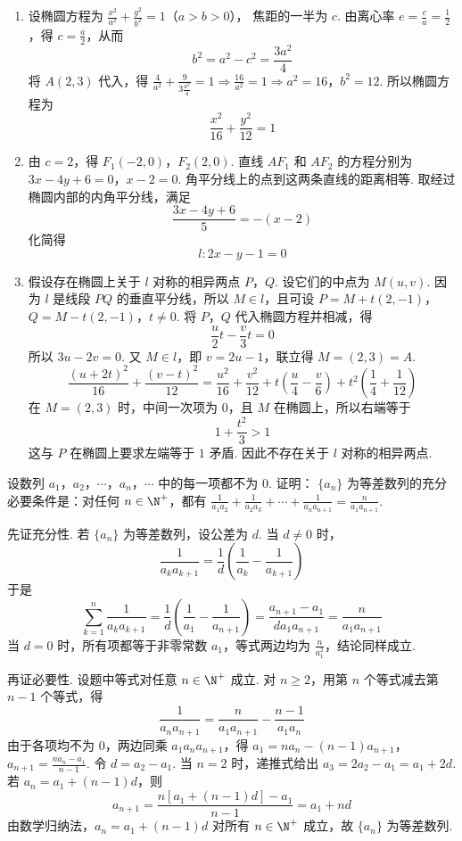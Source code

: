 \begin{solution}
\begin{enumerate}
\item 设椭圆方程为
\(\frac{x^2}{a^2}+\frac{y^2}{b^2}=1\)（\(a>b>0\)），
焦距的一半为 \(c\). 由离心率 \(e=\frac{c}{a}=\frac{1}{2}\)，得 \(c=\frac{a}{2}\)，从而
\[
b^2=a^2-c^2=\frac{3a^2}{4}
\]
将 \(A(2,3)\) 代入，得
\(\frac{4}{a^2}+\frac{9}{3\frac{a^2}{4}}=1 \Longrightarrow \frac{16}{a^2}=1 \Longrightarrow a^2=16\)，\(b^2=12\).
所以椭圆方程为
\[
\frac{x^2}{16}+\frac{y^2}{12}=1
\]
\item 由 \(c=2\)，得 \(F_1(-2,0)\)，\(F_2(2,0)\). 直线 \(AF_1\) 和 \(AF_2\) 的方程分别为
\(3x-4y+6=0\)，\(x-2=0\).
角平分线上的点到这两条直线的距离相等. 取经过椭圆内部的内角平分线，满足
\[
\frac{3x-4y+6}{5}=-(x-2)
\]
化简得
\[
l\colon 2x-y-1=0
\]
\item 假设存在椭圆上关于 \(l\) 对称的相异两点 \(P\)，\(Q\). 设它们的中点为 \(M(u,v)\). 因为 \(l\) 是线段 \(PQ\) 的垂直平分线，所以 \(M\in l\)，且可设
\(P=M+t(2,-1)\)，\(Q=M-t(2,-1)\)，\(t\neq0\).
将 \(P\)，\(Q\) 代入椭圆方程并相减，得
\[
\frac{u}{2}t-\frac{v}{3}t=0
\]
所以 \(3u-2v=0\). 又 \(M\in l\)，即 \(v=2u-1\)，联立得 \(M=(2,3)=A\).
\[
\frac{(u+2t)^2}{16}+\frac{(v-t)^2}{12}
=\frac{u^2}{16}+\frac{v^2}{12}
+t\left(\frac{u}{4}-\frac{v}{6}\right)
+t^2\left(\frac{1}{4}+\frac{1}{12}\right)
\]
在 \(M=(2,3)\) 时，中间一次项为 \(0\)，且 \(M\) 在椭圆上，所以右端等于
\[
1+\frac{t^2}{3}>1
\]
这与 \(P\) 在椭圆上要求左端等于 \(1\) 矛盾. 因此不存在关于 \(l\) 对称的相异两点.
\end{enumerate}
\end{solution}

\begin{problem}
设数列 \(a_{1}\)，\(a_{2}\)，\(\cdots\)，\(a_{n}\)，\(\cdots\) 中的每一项都不为 \(0\). 证明： \(\{a_{n}\}\) 为等差数列的充分必要条件是：对任何 \(n \in \N^{+}\)，都有 \(\frac{1}{a_{1} a_{2}} + \frac{1}{a_{2} a_{3}} + \cdots + \frac{1}{a_{n} a_{n+1}} = \frac{n}{a_{1} a_{n+1}}\).
\end{problem}

\begin{solution}
先证充分性. 若 \(\{a_n\}\) 为等差数列，设公差为 \(d\). 当 \(d\neq0\) 时，
\[
\frac{1}{a_k a_{k+1}}
=\frac{1}{d}\left(\frac{1}{a_k}-\frac{1}{a_{k+1}}\right)
\]
于是
\[
\sum_{k=1}^{n}\frac{1}{a_k a_{k+1}}
=\frac{1}{d}\left(\frac{1}{a_1}-\frac{1}{a_{n+1}}\right)
=\frac{a_{n+1}-a_1}{d a_1a_{n+1}}
=\frac{n}{a_1a_{n+1}}
\]
当 \(d=0\) 时，所有项都等于非零常数 \(a_1\)，等式两边均为 \(\frac{n}{a_1^2}\)，结论同样成立.

再证必要性. 设题中等式对任意 \(n\in\N^+\) 成立. 对 \(n\geqslant2\)，用第 \(n\) 个等式减去第 \(n-1\) 个等式，得
\[
\frac{1}{a_na_{n+1}}
=\frac{n}{a_1a_{n+1}}-\frac{n-1}{a_1a_n}
\]
由于各项均不为 \(0\)，两边同乘 \(a_1a_na_{n+1}\)，得
\(a_1=na_n-(n-1)a_{n+1}\)，\(a_{n+1}=\frac{na_n-a_1}{n-1}\).
令 \(d=a_2-a_1\). 当 \(n=2\) 时，递推式给出 \(a_3=2a_2-a_1=a_1+2d\). 若 \(a_n=a_1+(n-1)d\)，则
\[
a_{n+1}
=\frac{n[a_1+(n-1)d]-a_1}{n-1}
=a_1+nd
\]
由数学归纳法，\(a_n=a_1+(n-1)d\) 对所有 \(n\in\N^+\) 成立，故 \(\{a_n\}\) 为等差数列.
\end{solution}

